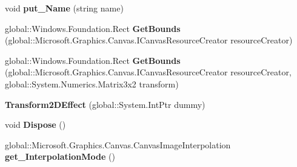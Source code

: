 \begin{DoxyCompactItemize}
\mbox{\label{class_microsoft_1_1_graphics_1_1_canvas_1_1_effects_1_1_transform2_d_effect_a6fa072080d740ed6d704f3dc36b862cd}} 
void {\bfseries put\+\_\+\+Name} (string name)
\item 
\mbox{\label{class_microsoft_1_1_graphics_1_1_canvas_1_1_effects_1_1_transform2_d_effect_a639c1cb942d1e2f5df6eed9ed4630dda}} 
global\+::\+Windows.\+Foundation.\+Rect {\bfseries Get\+Bounds} (global\+::\+Microsoft.\+Graphics.\+Canvas.\+I\+Canvas\+Resource\+Creator resource\+Creator)
\item 
\mbox{\label{class_microsoft_1_1_graphics_1_1_canvas_1_1_effects_1_1_transform2_d_effect_ac6842a4b23389a0cf09a892e0a70cdd6}} 
global\+::\+Windows.\+Foundation.\+Rect {\bfseries Get\+Bounds} (global\+::\+Microsoft.\+Graphics.\+Canvas.\+I\+Canvas\+Resource\+Creator resource\+Creator, global\+::\+System.\+Numerics.\+Matrix3x2 transform)
\item 
\mbox{\label{class_microsoft_1_1_graphics_1_1_canvas_1_1_effects_1_1_transform2_d_effect_a3748c768254be919302047eede7038cd}} 
{\bfseries Transform2\+D\+Effect} (global\+::\+System.\+Int\+Ptr dummy)
\item 
\mbox{\label{class_microsoft_1_1_graphics_1_1_canvas_1_1_effects_1_1_transform2_d_effect_ac0a088ca93fab0d1da165143fccc2bf1}} 
void {\bfseries Dispose} ()
\item 
\mbox{\label{class_microsoft_1_1_graphics_1_1_canvas_1_1_effects_1_1_transform2_d_effect_a3e8f7b5eac9642f7b67f3051339ad6e0}} 
global\+::\+Microsoft.\+Graphics.\+Canvas.\+Canvas\+Image\+Interpolation {\bfseries get\+\_\+\+Interpolation\+Mode} ()
\item 
\mbox{\label{class_microsoft_1_1_graphics_1_1_canvas_1_1_effects_1_1_transform2_d_effect_a7f4454ee99f14f9f2a19f8f9a7faf9f5}} 

\end{DoxyCompactItemize}
